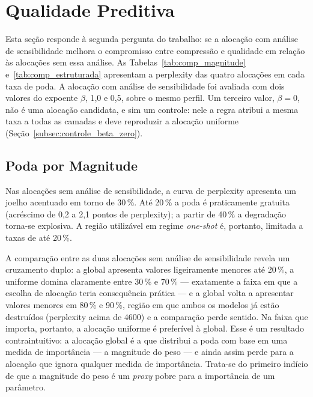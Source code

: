 \section{Qualidade Preditiva}\label{sec:res_qualidade}

Esta seção responde à segunda pergunta do trabalho: se a alocação com análise de
sensibilidade melhora o compromisso entre compressão e qualidade em relação às alocações
sem essa análise. As Tabelas~\ref{tab:comp_magnitude} e~\ref{tab:comp_estruturada}
apresentam a perplexity das quatro alocações em cada taxa de poda. A alocação com análise
de sensibilidade foi avaliada com dois valores do expoente $\beta$, 1,0 e 0,5, sobre o
mesmo perfil. Um terceiro valor, $\beta = 0$, não é uma alocação candidata, e sim um
controle: nele a regra atribui a mesma taxa a todas as camadas e deve reproduzir a
alocação uniforme (Seção~\ref{subsec:controle_beta_zero}).

\subsection{Poda por Magnitude}\label{subsec:aloc_magnitude}\label{sec:res_magnitude}

\begin{table}[htb]
\centering
\caption{Perplexity da poda por magnitude, sem retreinamento, nas quatro alocações. Em
negrito, o menor valor de cada taxa. $\beta$ é o expoente de intensidade da
Equação~\ref{eq:alocacao_dev}, que controla o quanto a alocação segue o perfil de
sensibilidade: com $\beta = 1{,}0$ o perfil é seguido integralmente, e com
$\beta = 0{,}5$ as diferenças entre camadas são atenuadas.}
\label{tab:comp_magnitude}
\small

\end{table}

Nas alocações sem análise de sensibilidade, a curva de perplexity apresenta um joelho
acentuado em torno de 30\,\%. Até 20\,\% a poda é praticamente gratuita (acréscimo de 0,2
a 2,1 pontos de perplexity); a partir de 40\,\% a degradação torna-se explosiva. A região
utilizável em regime \textit{one-shot} é, portanto, limitada a taxas de até 20\,\%.

A comparação entre as duas alocações sem análise de sensibilidade revela um cruzamento
duplo: a global apresenta valores ligeiramente menores até 20\,\%, a uniforme domina
claramente entre 30\,\% e 70\,\% --- exatamente a faixa em que a escolha de alocação
teria consequência prática --- e a global volta a apresentar valores menores em 80\,\% e
90\,\%, região em que ambos os modelos já estão destruídos (perplexity acima de 4600) e a
comparação perde sentido. Na faixa que importa, portanto, a alocação uniforme é
preferível à global. Esse é um resultado contraintuitivo: a alocação global é a que
distribui a poda com base em uma medida de importância --- a magnitude do peso --- e
ainda assim perde para a alocação que ignora qualquer medida de importância. Trata-se do
primeiro indício de que a magnitude do peso é um \textit{proxy} pobre para a importância
de um parâmetro.

